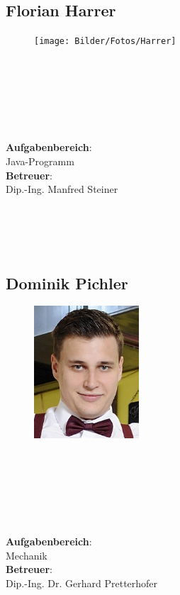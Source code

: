 \subsection*{Florian Harrer}
\begin{figure}
\begin{center}
  \texttt{[image: Bilder/Fotos/Harrer]}
\end{center}
\end{figure}
\mbox{}\\
\mbox{}\\
\mbox{}\\
\mbox{}\\
\mbox{}\\
\mbox{}\\
\textbf{Aufgabenbereich}:\\
Java-Programm\\
\textbf{Betreuer}:\\
Dip.-Ing. Manfred Steiner
\mbox{}\\
\mbox{}\\
\mbox{}\\
\mbox{}\\
\mbox{}\\
\newpage

\subsection*{Dominik Pichler}
\begin{figure}
\begin{center}
  \includegraphics[width=0.35\textwidth]{Bilder/Fotos/Pichler}
\end{center}
\end{figure}
\mbox{}\\
\mbox{}\\
\mbox{}\\
\mbox{}\\
\mbox{}\\
\mbox{}\\
\textbf{Aufgabenbereich}:\\
Mechanik\\
\textbf{Betreuer}:\\
Dip.-Ing. Dr. Gerhard Pretterhofer
\mbox{}\\
\mbox{}\\
\mbox{}\\
\mbox{}\\
\mbox{}\\


